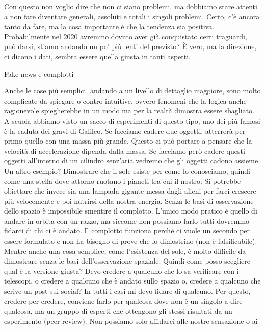 \documentclass[12pt]{book} %
\begin{document}
\bigskip

Con questo non voglio dire che non ci siano problemi, ma dobbiamo stare attenti a non fare diventare generali, assoluti
e totali i singoli problemi. Certo, c'è ancora tanto da fare, ma la cosa importante è che la
tendenza sia positiva. Probabilmente nel 2020 avremmo dovuto aver già conquistato certi traguardi, può darsi, stiamo
andando un po' più lenti del previsto? È vero, ma la direzione, ci dicono i dati, sembra essere quella giusta in tanti
aspetti.


\bigskip
\begin{mdframed}[linewidth=1pt]
Fake news e complotti

Anche le cose più semplici, andando a un livello di dettaglio maggiore, sono molto complicate da spiegare o
contro-intuitive, ovvero fenomeni che la logica anche ragionevole spiegherebbe in un modo ma per la realtà dimostra
essere sbagliato. A scuola abbiamo visto un sacco di esperimenti di questo tipo, uno dei più famosi è la caduta dei
gravi di Galileo. Se facciamo cadere due oggetti, atterrerà per primo quello con una massa più grande. Questo ci può
portare a pensare che la velocità di accelerazione dipenda dalla massa. Se facciamo però cadere questi oggetti
all'interno di un cilindro senz'aria vedremo che gli oggetti cadono assieme.
Un altro esempio? Dimostrare che il sole esiste per come lo conosciamo, quindi come una stella dove attorno ruotano i
pianeti tra cui il nostro. Si potrebbe obiettare che invece sia una lampada gigante messa dagli alieni per farci
crescere più velocemente e poi nutrirsi della nostra energia. Senza le basi di osservazione dello spazio è impossibile
smentire il complotto. L'unico modo pratico è quello di andare in orbita con un razzo, ma siccome non possiamo farlo
tutti dovremmo fidarci di chi ci è andato. Il complotto funziona perché ci vuole un secondo per essere formulato e non
ha bisogno di prove che lo dimostrino (non è falsificabile). Mentre anche una cosa semplice, come l'esistenza del sole,
è molto difficile da dimostrare senza le basi dell'osservazione spaziale. Quindi come posso scegliere qual è la
versione giusta? Devo credere a qualcuno che lo sa verificare con i telescopi, o credere a qualcuno che è andato sullo
spazio o, credere a qualcuno che scrive un post sui social? In tutti i casi mi devo fidare di qualcuno. Per questo,
credere per credere, conviene farlo per qualcosa dove non è un singolo a dire qualcosa, ma un gruppo di esperti che
ottengono gli stessi risultati da un esperimento (peer review). Non possiamo solo affidarci alle nostre sensazione o ai

\end{mdframed}
\end{document}
